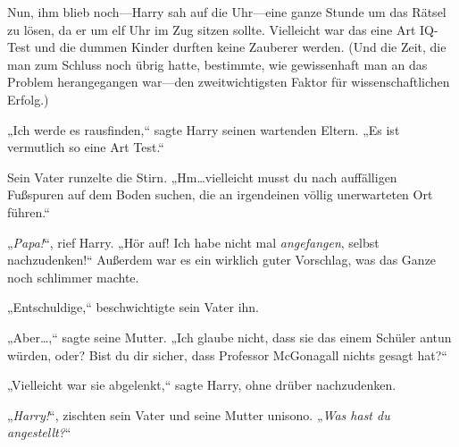 Nun, ihm blieb noch—Harry sah auf die Uhr—eine ganze Stunde um das Rätsel zu lösen, da er um elf Uhr im Zug sitzen sollte. Vielleicht war das eine Art IQ-Test und die dummen Kinder durften keine Zauberer werden. (Und die Zeit, die man zum Schluss noch übrig hatte, bestimmte, wie gewissenhaft man an das Problem herangegangen war—den zweitwichtigsten Faktor für wissenschaftlichen Erfolg.)

„Ich werde es rausfinden,“ sagte Harry seinen wartenden Eltern. „Es ist vermutlich so eine Art Test.“

Sein Vater runzelte die Stirn. „Hm…vielleicht musst du nach auffälligen Fußspuren auf dem Boden suchen, die an irgendeinen völlig unerwarteten Ort führen.“

„\emph{Papa!}“, rief Harry. „Hör auf! Ich habe nicht mal \emph{angefangen}, selbst nachzudenken!“ Außerdem war es ein wirklich guter Vorschlag, was das Ganze noch schlimmer machte.

„Entschuldige,“ beschwichtigte sein Vater ihn.

„Aber…,“ sagte seine Mutter. „Ich glaube nicht, dass sie das einem Schüler antun würden, oder? Bist du dir sicher, dass Professor McGonagall nichts gesagt hat?“

„Vielleicht war sie abgelenkt,“ sagte Harry, ohne drüber nachzudenken.

„\emph{Harry!}“, zischten sein Vater und seine Mutter unisono. „\emph{Was hast du angestellt?}“

